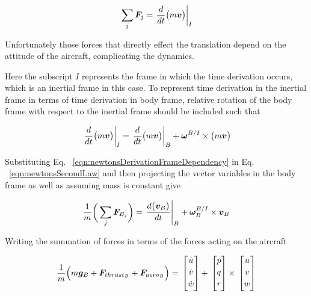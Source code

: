 \begin{equation}{\label{eqn:newtonsSecondLaw}}
\sum_j \bm{F}_j = \left. \frac{d}{dt} \big( m \bm{v} \big) \right|_I
\end{equation}

Unfortunately those forces that directly effect the translation depend on the attitude of the aircraft, complicating the dynamics.

Here the subscript $I$ represents the frame in which the time derivation occurs, which is an inertial frame in this case. 
To represent time derivation in the inertial frame in terms of time derivation in body frame, relative rotation of the body frame with respect to the inertial frame should be included such that


\begin{equation}{\label{eqn:newtonsDerivationFrameDependency}}
\left. \frac{d}{dt} \big( m \bm{v} \big) \right|_I = \left. \frac{d}{dt} \big( m \bm{v} \big) \right|_B + \bm{\omega}^{B/I} \times \big( m\bm{v} \big)
\end{equation}

Substituting Eq. ~\ref{eqn:newtonsDerivationFrameDependency} in Eq. ~\ref{eqn:newtonsSecondLaw} and then projecting the vector variables in the body frame as well as assuming mass is constant give


 \begin{equation}{\label{eqn:newtonsSecondLaw}}
\frac{1}{m} \bigg( \sum_j \bm{F}_{B_j} \bigg)= \left. \frac{d\big(\bm{v}_B \big)}{dt}  \right|_B + \bm{\omega}_B^{B/I} \times \bm{v}_B
\end{equation}

Writing the summation of forces in terms of the forces acting on the aircraft

\begin{equation}{\label{eqn:dynamicsEquation1}}
\frac{1}{m} \Big( m \bm{g}_B + \bm{F}_{{thrust}_B} + \bm{F}_{{aero}_B} \Big)  =\,
\begin{bmatrix}
\dot{u}\\[0.2em]
\dot{v}\\[0.2em]
\dot{w}\\[0.2em]
\end{bmatrix}
+\,
\begin{bmatrix}
p\\[0.2em]
q\\[0.2em]
r\\[0.2em]
\end{bmatrix}
\times \,
\begin{bmatrix}
u\\[0.2em]
v\\[0.2em]
w\\[0.2em]
\end{bmatrix}
\end{equation}


